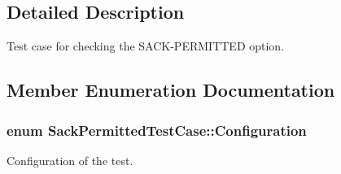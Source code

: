 \subsection{Detailed Description}
Test case for checking the S\+A\+C\+K-\/\+P\+E\+R\+M\+I\+T\+T\+ED option. 

\subsection{Member Enumeration Documentation}
\subsubsection[{\texorpdfstring{Configuration}{Configuration}}]{\setlength{\rightskip}{0pt plus 5cm}enum {\bf Sack\+Permitted\+Test\+Case\+::\+Configuration}}\hypertarget{classSackPermittedTestCase_a2dc95ae5e965bc36df7ea84c64723493}{}\label{classSackPermittedTestCase_a2dc95ae5e965bc36df7ea84c64723493}


Configuration of the test. 

